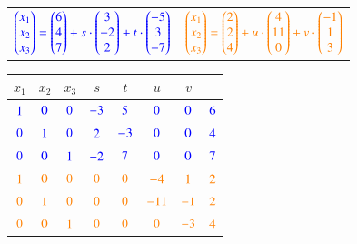 \columnbreak
{}		    					

\begin{tabular}{ll}
	${\color{blue}\begin{pmatrix} x_1 \\ x_2 \\ x_3 \end{pmatrix} = 
	\begin{pmatrix} 6 \\ 4 \\ 7 \end{pmatrix} 
	+ s \cdot \begin{pmatrix} 3 \\ -2 \\ 2\end{pmatrix} 
	+ t \cdot \begin{pmatrix} -5 \\ 3 \\ -7\end{pmatrix}}$
	&
	${\color{orange}\begin{pmatrix} x_1 \\ x_2 \\ x_3 \end{pmatrix} = 
	\begin{pmatrix} 2 \\ 2 \\ 4 \end{pmatrix} 
	+ u \cdot \begin{pmatrix} 4 \\ 11 \\ 0\end{pmatrix} 
	+ v \cdot \begin{pmatrix} -1 \\ 1 \\ 3\end{pmatrix}}$
\end{tabular}

\vspace{0.2cm}

\begin{tabular}{| c c c c c c c | c |}
\hline
$x_1$ 		& $x_2$ 	& $x_3$ 	& $s$ 			& $t$ 			& $u$ 			& $v$ 			&  			\\
\hline
${\color{blue}1}$ 	& ${\color{blue}0}$ & ${\color{blue}0}$ & ${\color{blue}-3}$	& ${\color{blue}5}$		& ${\color{blue}0}$ 	& ${\color{blue}0}$ 	& ${\color{blue}6}$	\\
${\color{blue}0}$ 	& ${\color{blue}1}$ & ${\color{blue}0}$ & ${\color{blue}2}$ 	& ${\color{blue}-3}$	& ${\color{blue}0}$ 	& ${\color{blue}0}$ 	& ${\color{blue}4}$	\\
${\color{blue}0}$ 	& ${\color{blue}0}$ & ${\color{blue}1}$ & ${\color{blue}-2}$ 	& ${\color{blue}7}$		& ${\color{blue}0}$ 	& ${\color{blue}0}$ 	& ${\color{blue}7}$ \\
${\color{orange}1}$ 	& ${\color{orange}0}$ & ${\color{orange}0}$ & ${\color{orange}0}$ 	& ${\color{orange}0}$		& ${\color{orange}-4}$ 	& ${\color{orange}1}$ 	& ${\color{orange}2}$ \\
${\color{orange}0}$ 	& ${\color{orange}1}$ & ${\color{orange}0}$ & ${\color{orange}0}$		& ${\color{orange}0}$		& ${\color{orange}-11}$	& ${\color{orange}-1}$	& ${\color{orange}2}$ \\
${\color{orange}0}$ 	& ${\color{orange}0}$ & ${\color{orange}1}$ & ${\color{orange}0}$ 	& ${\color{orange}0}$		& ${\color{orange}0}$ 	& ${\color{orange}-3}$	& ${\color{orange}4}$ \\
\hline
\end{tabular}		
	

